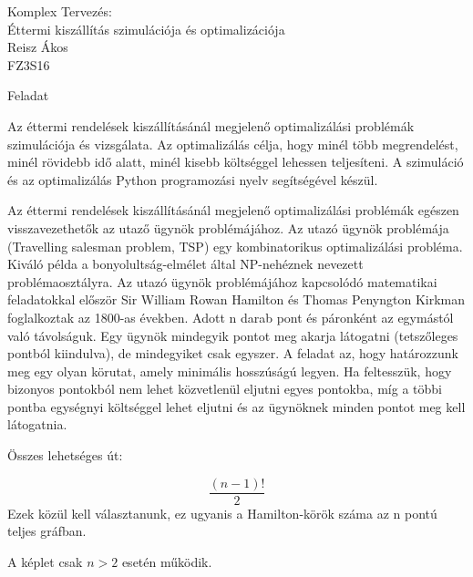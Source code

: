 \documentclass[12pt,a4paper]{article}
\begin{document}
\vskip 2cm

\begin{center}
\begin{huge}

Komplex Tervezés: \\
Éttermi kiszállítás szimulációja és optimalizációja \\
Reisz Ákos \\
FZ3S16 \\

\end{huge}
\end{center}

\vskip 5cm

\begin{large}

Feladat

\end{large}

Az éttermi rendelések kiszállításánál megjelenő optimalizálási problémák szimulációja és vizsgálata. Az optimalizálás célja, hogy minél több megrendelést, minél rövidebb idő alatt, minél kisebb költséggel lehessen teljesíteni. A szimuláció és az optimalizálás Python programozási nyelv segítségével készül.


Az éttermi rendelések kiszállításánál megjelenő optimalizálási problémák egészen visszavezethetők az utaző ügynök problémájához. Az utazó ügynök problémája (Travelling salesman problem, TSP) egy kombinatorikus optimalizálási probléma. Kiváló példa a bonyolultság-elmélet által NP-nehéznek nevezett problémaosztályra. Az utazó ügynök problémájához kapcsolódó matematikai feladatokkal először Sir William Rowan Hamilton és Thomas Penyngton Kirkman foglalkoztak az 1800-as években. Adott n darab pont és páronként az egymástól való távolságuk. Egy ügynök mindegyik pontot meg akarja látogatni (tetszőleges pontból kiindulva), de mindegyiket csak egyszer. A feladat az, hogy határozzunk meg egy olyan körutat, amely minimális hosszúságú legyen. Ha feltesszük, hogy bizonyos pontokból nem lehet közvetlenül eljutni egyes pontokba, míg a többi pontba egységnyi költséggel lehet eljutni és az ügynöknek minden pontot meg kell látogatnia.

\begin{center}
Összes lehetséges út:
\end{center}

\[
\dfrac{(n-1)!}{2}
\]
Ezek közül kell választanunk, ez ugyanis a Hamilton-körök száma az n pontú teljes gráfban.

A képlet csak $n > 2$ esetén működik.
\end{document}
